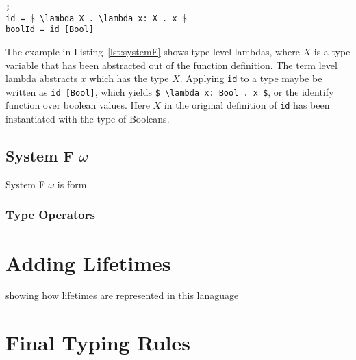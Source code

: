 \begin{lstlisting}[mathescape, nolol, label={lst:systemf}];
id = $ \lambda X . \lambda x: X . x $
boolId = id [Bool]
\end{lstlisting}

The example in Listing~\ref{lst:systemF} shows type level lambdas, where $ X $
is a type variable that has been abstracted out of the function definition. The
term level lambda abstracts $ x $ which has the type $ X $. Applying \lstinline{id}
to a type maybe be written as \lstinline[mathescape]{id [Bool]}, which 
yields \lstinline[mathescape]{$ \lambda x: Bool . x $}, or the identify function
over boolean values. Here $ X $ in the original definition of \lstinline{id} has
been instantiated with the type of Booleans.

\subsection{System F $\omega$}\label{sec:omega}
System F $\omega$ is form

\subsubsection{Type Operators}

\section{Adding Lifetimes}
showing how lifetimes are represented in this lanaguage

\section{Final Typing Rules}

